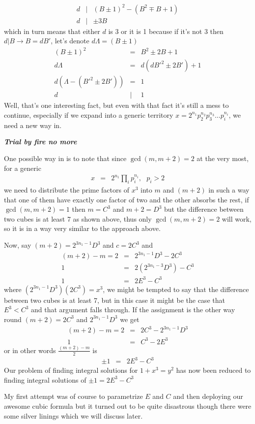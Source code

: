 \documentclass[aps,preprint,preprintnumbers,nofootinbib,showpacs,prd]{revtex4-1}
\newcommand{\nbea}{\begin{eqnarray*}}
\newcommand{\neea}{\end{eqnarray*}}
\begin{document}
%
\nbea
d &|& (B \pm 1)^2 - (B^2 \mp B + 1) \\
d &|& \pm 3B
\neea
%
which in turn means that either $d$ is 3 or it is 1 because if it's not 3 then $d|B \to B = dB'$, let's denote $d\Lambda = (B \pm 1)$
%
\nbea
(B \pm 1)^2 & = & B^2 \pm 2B + 1 \\
d\Lambda & = & d(dB'^2 \pm 2B') + 1 \\
d(\Lambda - (B'^2 \pm 2B')) & = & 1 \\
d &|& 1
\neea
%
Well, that's one interesting fact, but even with that fact it's still a mess to continue, especially if we expand into a generic territory $x = 2^{n_1}p_2^{n_2}p_3^{n_3} \dots p_i^{n_i}$, we need a new way in.

\bigskip
\textit{\textbf{Trial by fire no more}}
\smallskip

One possible way in is to note that since $\gcd(m,m+2) = 2$ at the very most, for a generic
%
\nbea
x & = & 2^{n_1}\prod_i p_i^{n_i}, ~~~ p_i > 2
\neea
%
we need to distribute the prime factors of $x^3$ into $m$ and $(m+2)$ in such a way that one of them have exactly one factor of two and the other absorbs the rest, if $\gcd(m,m+2) = 1$ then $m = C^3$ and $m+2 = D^3$ but the difference between two cubes is at least 7 as shown above, thus only $\gcd(m,m+2) = 2$ will work, so it is in a way very similar to the approach above.

Now, say $(m+2) = 2^{3n_1-1} D^3$ and $c = 2 C^3$ and 
%
\nbea
(m + 2) - m = 2 & = & 2^{3n_1-1} D^3 - 2 C^3 \\
1 & = & 2 (2^{3n_1-3} D^3) - C^3 \\
1 & = & 2 E^3 - C^3
\neea
%
where $(2^{3n_1-1} D^3)(2 C^3) = x^3$, we might be tempted to say that the difference between two cubes is at least 7, but in this case it might be the case that $E^3 < C^3$ and that argument falls through. If the assignment is the other way round $(m+2) = 2 C^3$ and $2^{3n_1-1} D^3$ we get 
%
\nbea
(m + 2) - m = 2 & = & 2 C^3 - 2^{3n_1-1} D^3 \\
1 & = & C^3 - 2 E^3 
\neea
%
or in other words $\frac{(m+2) - m}{2}$ is
%
\nbea
\pm 1 & = & 2 E^3 - C^3
\neea
%
Our problem of finding integral solutions for $1 + x^3 = y^2$ has now been reduced to finding integral solutions of $\pm 1 = 2 E^3 - C^3$

My first attempt was of course to parametrize $E$ and $C$ and then deploying our awesome cubic formula but it turned out to be quite disastrous though there were some silver linings which we will discuss later.
\end{document}
